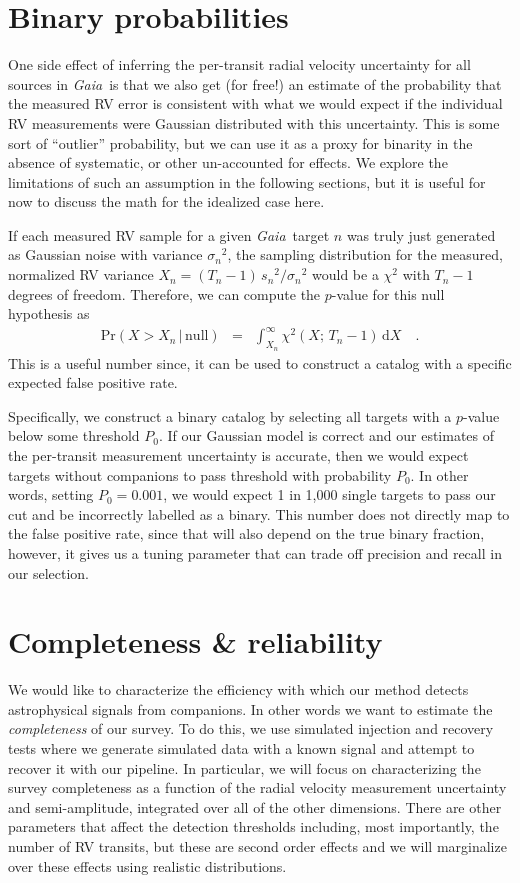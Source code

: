 \documentclass[modern, letterpaper]{aastex63}
\newcommand{\project}[1]{\textsl{#1}}
\newcommand{\Gaia}{\project{Gaia}}
\newcommand{\dd}{\ensuremath{\,\mathrm{d}}}
\begin{document}
\section{Binary probabilities}

One side effect of inferring the per-transit radial velocity uncertainty for all sources in \Gaia\ is that we also get (for free!) an estimate of the probability that the measured RV error is consistent with what we would expect if the individual RV measurements were Gaussian distributed with this uncertainty.
This is some sort of ``outlier'' probability, but we can use it as a proxy for binarity in the absence of systematic, or other un-accounted for effects.
We explore the limitations of such an assumption in the following sections, but it is useful for now to discuss the math for the idealized case here.

If each measured RV sample for a given \Gaia\ target $n$ was truly just generated as Gaussian noise with variance ${\sigma_n}^2$, the sampling distribution for the measured, normalized RV variance $X_n = (T_n - 1)\,{s_n}^2 / {\sigma_n}^2$ would be a $\chi^2$ with $T_n - 1$ degrees of freedom.
Therefore, we can compute the $p$-value for this null hypothesis as
\begin{eqnarray}
  \mathrm{Pr}(X > X_n\,|\,\mathrm{null}) &=& \int_{X_n}^\infty \chi^2 (X;\,T_n-1) \dd X \quad.
\end{eqnarray}
This is a useful number since, it can be used to construct a catalog with a specific expected false positive rate.

Specifically, we construct a binary catalog by selecting all targets with a $p$-value below some threshold $P_0$.
If our Gaussian model is correct and our estimates of the per-transit measurement uncertainty is accurate, then we would expect targets without companions to pass threshold with probability $P_0$.
In other words, setting $P_0 = 0.001$, we would expect 1 in 1,000 single targets to pass our cut and be incorrectly labelled as a binary.
This number does not directly map to the false positive rate, since that will also depend on the true binary fraction, however, it gives us a tuning parameter that can trade off precision and recall in our selection.

\section{Completeness \& reliability}

We would like to characterize the efficiency with which our method detects astrophysical signals from companions.
In other words we want to estimate the \emph{completeness} of our survey.
To do this, we use simulated injection and recovery tests where we generate simulated data with a known signal and attempt to recover it with our pipeline.
In particular, we will focus on characterizing the survey completeness as a function of the radial velocity measurement uncertainty and semi-amplitude, integrated over all of the other dimensions.
There are other parameters that affect the detection thresholds including, most importantly, the number of RV transits, but these are second order effects and we will marginalize over these effects using realistic distributions.
\end{document}
